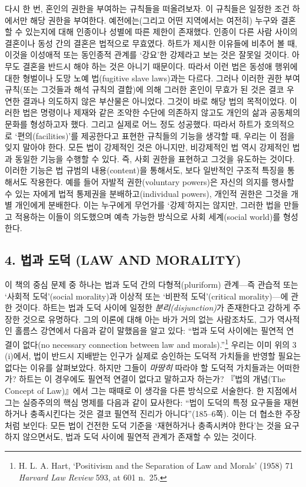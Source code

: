 \documentclass[12pt, oneside]{book}  %
\begin{document}
다시 한 번, 혼인의 권한을 부여하는 규칙들을 떠올려보자. 이 규칙들은
일정한 조건 하에서만 해당 권한을 부여한다. 예전에는(그리고 어떤
지역에서는 여전히) 누구와 결혼할 수 있는지에 대해 인종이나 성별에 따른
제한이 존재했다. 인종이 다른 사람 사이의 결혼이나 동성 간의 결혼은
법적으로 무효였다. 하트가 제시한 이유들에 비추어 볼 때, 이것을 이성애적
또는 동인종적 관계를 `강요'한 강제라고 보는 것은 잘못일 것이다. 아무도
결혼을 반드시 해야 하는 것은 아니기 때문이다. 따라서 이런 법은 동성애
행위에 대한 형벌이나 도망 노예 법(fugitive slave laws)과는 다르다.
그러나 이러한 권한 부여 규칙(또는 그것들과 해석 규칙의 결합)에 의해
그러한 혼인이 무효가 된 것은 결코 우연한 결과나 의도하지 않은 부산물은
아니었다. 그것이 바로 해당 법의 목적이었다. 이러한 법은 명령이나 제재와
같은 조악한 수단에 의존하지 않고도 개인의 삶과 공동체의 문화를
형성하고자 했다. 그리고 실제로 어느 정도 성공했다. 따라서 하트가
호의적으로 `편의(facilities)'를 제공한다고 표현한 규칙들의 기능을 생각할
때, 우리는 이 점을 잊지 말아야 한다. 모든 법이 강제적인 것은 아니지만,
비강제적인 법 역시 강제적인 법과 동일한 기능을 수행할 수 있다. 즉, 사회
권한을 표현하고 그것을 유도하는 것이다. 이러한 기능은 법 규범의
내용(content)을 통해서도, 보다 일반적인 구조적 특징을 통해서도 작용한다.
예를 들어 자발적 권한(voluntary powers)은 자신의 의지를 행사할 수 있는
자에게 법적 통제권을 분배하고(individual powers), 개인적 권한은 그것을
개별 개인에게 분배한다. 이는 누구에게 무언가를 `강제'하지는 않지만,
그러한 법을 만들고 적용하는 이들이 의도했으며 예측 가능한 방식으로 사회
세계(social world)를 형성한다.

\subsection{\texorpdfstring{\textbf{4. 법과 도덕 (LAW AND
MORALITY)}}{4. 법과 도덕 (LAW AND MORALITY)}}\label{uxbc95uxacfc-uxb3c4uxb355-law-and-morality}

이 책의 중심 문제 중 하나는 법과 도덕 간의 다형적(pluriform) 관계---즉
관습적 또는 `사회적 도덕'(social morality)과 이상적 또는 `비판적
도덕'(critical morality)---에 관한 것이다. 하트는 법과 도덕 사이에
일정한 \emph{분리(disjunction)}가 존재한다고 강하게 주장한 것으로
유명하다. 그의 이론에 대해 아는 바가 거의 없는 사람조차도, 그가 역사적인
홀름스 강연에서 다음과 같이 말했음을 알고 있다: ``법과 도덕 사이에는
필연적 연결이 없다(no necessary connection between law and
morals).''\footnote{H. L. A. Hart, `Positivism and the Separation of Law
  and Morals' (1958) 71 \emph{Harvard Law Review} 593, at 601 n.~25.}
우리는 이미 위의 3 (i)에서, 법이 반드시 지배받는 인구가 실제로 승인하는
도덕적 가치들을 반영할 필요는 없다는 이유를 살펴보았다. 하지만 그들이
\emph{마땅히} 따라야 할 도덕적 가치들과는 어떠한가? 하트는 이 경우에도
필연적 연결이 없다고 말하고자 하는가? 『법의 개념(The Concept of
Law)』에서 그는 때때로 이 생각을 다른 방식으로 서술한다. 한 지점에서
그는 실증주의의 핵심 명제를 다음과 같이 묘사한다: ``법이 도덕의 특정
요구들을 재현하거나 충족시킨다는 것은 결코 필연적 진리가
아니다''(185--6쪽). 이는 더 협소한 주장처럼 보인다: 모든 법이 건전한
도덕 기준을 `재현하거나 충족시켜야 한다'는 것을 요구하지 않으면서도,
법과 도덕 사이에 필연적 관계가 존재할 수 있는 것이다.
\end{document}
